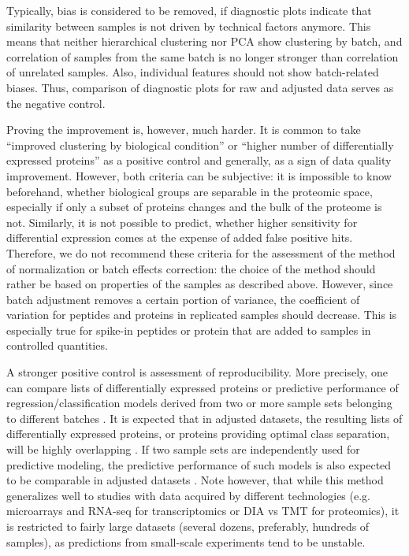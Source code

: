 \documentclass[num-refs]{wiley-article}
\begin{document}
Typically, bias is considered to be removed, if diagnostic plots indicate that similarity between samples is not driven by technical factors anymore. This means that neither hierarchical clustering nor PCA show clustering by batch, and correlation of samples from the same batch is no longer stronger than correlation of unrelated samples. Also, individual features should not show batch-related biases. Thus, comparison of diagnostic plots for raw and adjusted data serves as the negative control.

Proving the improvement is, however, much harder. It is common to take “improved clustering by biological condition” or “higher number of differentially expressed proteins” as a positive control and generally, as a sign of data quality improvement. However, both criteria can be subjective: it is impossible to know beforehand, whether biological groups are separable in the proteomic space, especially if only a subset of proteins changes and the bulk of the proteome is not. Similarly, it is not possible to predict, whether higher sensitivity for differential expression comes at the expense of added false positive hits. Therefore, we do not recommend these criteria for the assessment of the method of normalization or batch effects correction: the choice of the method should rather be based on properties of the samples as described above. However, since batch adjustment removes a certain portion of variance, the coefficient of variation for peptides and proteins in replicated samples should decrease. This is especially true for spike-in peptides or protein that are added to samples in controlled quantities. 

A stronger positive control is assessment of reproducibility. More precisely, one can compare lists of differentially expressed proteins or predictive performance of regression/classification models derived from two or more sample sets belonging to different batches \cite{Lazar:2013aa}. It is expected that in adjusted datasets, the resulting lists of differentially expressed proteins, or proteins providing optimal class separation, will be highly overlapping \cite{Shabalin:2008aa}. If two sample sets are independently used for predictive modeling, the predictive performance of such models is also expected to be comparable in adjusted datasets \cite{Luo2010}. Note however, that while this method generalizes well to studies with data acquired by different technologies (e.g. microarrays and RNA-seq for transcriptomics or DIA vs TMT for proteomics), it is restricted to fairly large datasets (several dozens, preferably, hundreds of samples), as predictions from small-scale experiments tend to be unstable.
 
\end{document}
